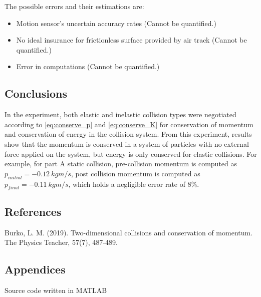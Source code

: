 \documentclass[a4paper, 12pt]{article}
\newcommand{\subhead}[1]{\subsection{\normalsize #1}}
\begin{document}
    \newpage
    \noindent
    The possible errors and their estimations are:
    \begin{itemize}
        \item Motion sensor’s uncertain accuracy rates (Cannot be quantified.)
        \item No ideal insurance for frictionless surface provided by air track (Cannot be quantified.)
        \item Error in computations (Cannot be quantified.)
    \end{itemize}
    \subhead{Conclusions}
    In the experiment, both elastic and inelastic collision types were negotiated according to \cref{eq:conserve_p}
    and \cref{eq:conserve_K} for conservation of momentum and conservation of energy in the collision system. From this 
    experiment, results show that the momentum is conserved in a system of particles with no external 
    force applied on the system, but energy is only conserved for elastic collisions. For example, for part A 
    static collision, pre-collision momentum is computed as $p_{initial} = -0.12~kgm/s$, post collision momentum is 
    computed as $p_{final} = -0.11~kgm/s$, which holds a negligible error rate of 8\%.

    \subhead{References}
    Burko, L. M. (2019). Two-dimensional collisions and conservation of momentum. The Physics Teacher, 57(7), 487-489.

    \subhead{Appendices}
    \noindent
    Source code written in MATLAB
    

    \clearpage
\end{document}
